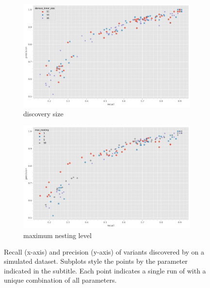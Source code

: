 \begin{figure}
\begin{subfigure}[b]{0.475\textwidth}
     \end{subfigure}
     \begin{subfigure}[b]{0.475\textwidth}
         \centering
        \caption[position=above]{\denovo{} discovery \kmer{} size}
        \label{fig:denovo-sims-kmer-size}
        \includegraphics[width=1\linewidth]{Chapter1/Figs/denovo_precrec_kmer.png}
     \end{subfigure}
     \begin{subfigure}[b]{0.475\textwidth}
         \centering
         \caption[position=above]{\prg{} maximum nesting level}
         \label{fig:denovo-sims-nesting}
        \includegraphics[width=1\linewidth]{Chapter1/Figs/denovo_precrec_nesting.png}
     \end{subfigure}
    \caption{Recall (x-axis) and precision (y-axis) of \denovo{} variants discovered by \pandora{} on a simulated dataset. Subplots style the points by the parameter indicated in the subtitle. Each point indicates a single run of \pandora{} with a unique combination of all parameters.}
        \label{fig:denovo-sims}
\end{figure}

